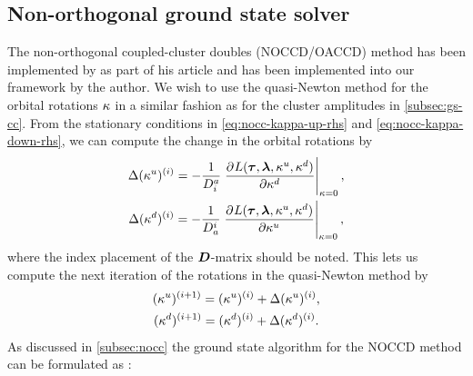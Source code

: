         \subsection{Non-orthogonal ground state solver}
            The non-orthogonal coupled-cluster doubles (NOCCD/OACCD) method has been
            implemented by \citeauthor{rolf-nocc} as part of his article
             \cite{rolf-nocc} and has been implemented into
            our framework by the author.
            We wish to use the quasi-Newton method for the orbital rotations
            $\kappa$ in a similar fashion as for the cluster amplitudes in
            \autoref{subsec:gs-cc}.
            From the stationary conditions in \autoref{eq:nocc-kappa-up-rhs} and
            \autoref{eq:nocc-kappa-down-rhs}, we can compute the change in the
            orbital rotations by \cite{ugur-occ}
            \begin{gather}
                \Delta (\noccten^{u})^{(i)}
                = -\frac{1}{D^a_i}
                \left.
                \dpd{
                    L(\vfg{\clustamp}, \vfg{\clustlamp},
                    \noccten^{u}, \noccten^{d})
                }{
                    {\noccten^{d}}
                }
                \right\rvert_{\noccten = 0},
                \\
                \Delta (\noccten^{d})^{(i)}
                = -\frac{1}{D^i_a}
                \left.
                \dpd{
                    L(\vfg{\clustamp}, \vfg{\clustlamp},
                    \noccten^{u}, \noccten^{d})
                }{
                    {\noccten^{u}}
                }
                \right\rvert_{\noccten = 0},
            \end{gather}
            where the index placement of the $\boldsymbol{D}$-matrix should be noted.
            This lets us compute the next iteration of the rotations in the
            quasi-Newton method by
            \begin{gather}
                (\kappa^{u})^{(i + 1)}
                = (\kappa^{u})^{(i)} + \Delta(\kappa^{u})^{(i)}, \\
                (\kappa^{d})^{(i + 1)}
                = (\kappa^{d})^{(i)} + \Delta(\kappa^{d})^{(i)}.
            \end{gather}
            As discussed in \autoref{subsec:nocc} the ground state algorithm for
            the NOCCD method can be formulated as \cite{ugur-occ, rolf-nocc}:
